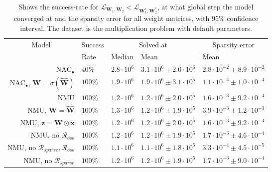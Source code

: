 \begin{table}[!h]

\caption{\label{tab:function-task-static-ablation}Shows the success-rate for $\mathcal{L}_{\mathbf{W}_1, \mathbf{W}_2} < \mathcal{L}_{\mathbf{W}_1^\epsilon, \mathbf{W}_2^*}$, at what global step the model converged at and the sparsity error for all weight matrices, with 95\% confidence interval. The dataset is the multiplication problem with default parameters.}
\centering
\begin{tabular}{rllll}
\toprule
\multicolumn{1}{c}{Model} & \multicolumn{1}{c}{Success} & \multicolumn{2}{c}{Solved at} & \multicolumn{1}{c}{Sparsity error} \\
\cmidrule(l{3pt}r{3pt}){1-1} \cmidrule(l{3pt}r{3pt}){2-2} \cmidrule(l{3pt}r{3pt}){3-4} \cmidrule(l{3pt}r{3pt}){5-5}
 & Rate & Median & Mean & Mean\\
\midrule
$\mathrm{NAC}_{\bullet}$ & $40\%$ & $2.8 \cdot 10^{6}$ & $3.1 \cdot 10^{6} \pm 2.0 \cdot 10^{6}$ & $2.8 \cdot 10^{-2} \pm 8.9 \cdot 10^{-2}$\\

$\mathrm{NAC}_{\bullet}$, $\mathbf{W} = \sigma(\mathbf{\hat{W}})$ & $100\%$ & $1.9 \cdot 10^{6}$ & $1.9 \cdot 10^{6} \pm 3.1 \cdot 10^{5}$ & $1.1 \cdot 10^{-4} \pm 1.0 \cdot 10^{-4}$\\

NMU & $100\%$ & $1.2 \cdot 10^{6}$ & $1.2 \cdot 10^{6} \pm 2.0 \cdot 10^{5}$ & $1.6 \cdot 10^{-3} \pm 9.2 \cdot 10^{-4}$\\

NMU, $\mathbf{W} = \mathbf{\hat{W}}$ & $100\%$ & $1.3 \cdot 10^{6}$ & $1.2 \cdot 10^{6} \pm 1.9 \cdot 10^{5}$ & $3.9 \cdot 10^{-3} \pm 1.2 \cdot 10^{-3}$\\

NMU, $\mathbf{z} = \mathbf{W} \odot \mathbf{x}$ & $100\%$ & $1.2 \cdot 10^{6}$ & $1.2 \cdot 10^{6} \pm 2.0 \cdot 10^{5}$ & $1.6 \cdot 10^{-3} \pm 9.2 \cdot 10^{-4}$\\

NMU, no $\mathcal{R}_{oob}$ & $100\%$ & $1.2 \cdot 10^{6}$ & $1.2 \cdot 10^{6} \pm 1.9 \cdot 10^{5}$ & $1.7 \cdot 10^{-3} \pm 4.6 \cdot 10^{-4}$\\

NMU, no $\mathcal{R}_{sparse},\mathcal{R}_{oob}$ & $100\%$ & $1.1 \cdot 10^{6}$ & $1.1 \cdot 10^{6} \pm 1.8 \cdot 10^{5}$ & $3.3 \cdot 10^{-4} \pm 4.5 \cdot 10^{-5}$\\

NMU, no $\mathcal{R}_{sparse}$ & $100\%$ & $1.2 \cdot 10^{6}$ & $1.2 \cdot 10^{6} \pm 1.9 \cdot 10^{5}$ & $1.7 \cdot 10^{-3} \pm 9.0 \cdot 10^{-4}$\\
\bottomrule
\end{tabular}
\end{table}
